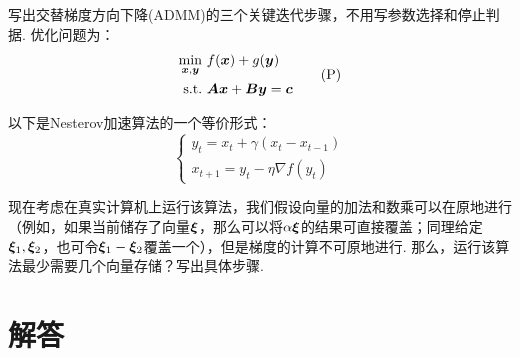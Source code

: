 \begin{question}[$5$]
    写出交替梯度方向下降(ADMM)的三个关键迭代步骤，不用写参数选择和停止判据. 优化问题为：
    \[
    \begin{aligned}
        \min_{\boldsymbol{x}, \boldsymbol{y}} \ & f(\boldsymbol{x}) + g(\boldsymbol{y}) \\ 
        \text{s.t.} \ & \boldsymbol{Ax} + \boldsymbol{By} = \boldsymbol{c}
    \end{aligned}
    \tag{P}
    \]
\end{question}

\begin{question}[$5=1+4$]
    以下是Nesterov加速算法的一个等价形式：
    \[
    \begin{cases}
    y_t = x_t + \gamma(x_t - x_{t-1}) \\
    x_{t+1} = y_t - \eta \nabla f(y_t)
    \end{cases}
    \]

    现在考虑在真实计算机上运行该算法，我们假设向量的加法和数乘可以在原地进行（例如，如果当前储存了向量$\boldsymbol{\xi}$，那么可以将$\alpha \boldsymbol{\xi}$的结果可直接覆盖；同理给定$\boldsymbol{\xi}_1, \boldsymbol{\xi}_2$，也可令$\boldsymbol{\xi}_1 - \boldsymbol{\xi}_2$覆盖一个），但是梯度的计算不可原地进行. 那么，运行该算法最少需要几个向量存储？写出具体步骤. 
\end{question}

\newpage
\section{解答}

\begin{solution}[第一题]

\end{solution}

\begin{solution}[第二题]

\end{solution}

\begin{solution}[第三题]

\end{solution}

\begin{solution}[第四题]

\end{solution}

\begin{solution}[第五题]

\end{solution}

\begin{solution}[第六题]

\end{solution}

\begin{solution}[第七题]

\end{solution}

\begin{solution}[第八题]

\end{solution}

\begin{solution}[第九题]

\end{solution}

\begin{solution}[第十题]

\end{solution}